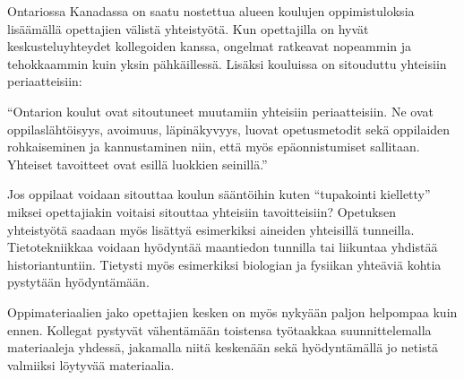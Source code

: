 \documentclass[utf8,bachelor]{gradu3}
\begin{document}
Ontariossa Kanadassa on saatu nostettua alueen koulujen oppimistuloksia lisäämällä opettajien välistä yhteistyötä. Kun opettajilla on hyvät keskusteluyhteydet kollegoiden kanssa, ongelmat ratkeavat nopeammin ja tehokkaammin kuin yksin pähkäillessä. Lisäksi kouluissa on sitouduttu yhteisiin periaatteisiin:

“Ontarion koulut ovat sitoutuneet muutamiin yhteisiin periaatteisiin. Ne ovat oppilaslähtöisyys, avoimuus, läpinäkyvyys, luovat opetusmetodit sekä oppilaiden rohkaiseminen ja kannustaminen niin, että myös epäonnistumiset sallitaan. Yhteiset tavoitteet ovat esillä luokkien seinillä.” \parencite[][]{KanadanMalli} 

Jos oppilaat voidaan sitouttaa koulun sääntöihin kuten “tupakointi kielletty” miksei opettajiakin voitaisi sitouttaa yhteisiin tavoitteisiin? Opetuksen yhteistyötä saadaan myös lisättyä esimerkiksi aineiden yhteisillä tunneilla. Tietotekniikkaa voidaan hyödyntää maantiedon tunnilla tai liikuntaa yhdistää historiantuntiin. Tietysti myös esimerkiksi biologian ja fysiikan yhteäviä kohtia pystytään hyödyntämään.

Oppimateriaalien jako opettajien kesken on myös nykyään paljon helpompaa kuin ennen. Kollegat pystyvät vähentämään toistensa työtaakkaa suunnittelemalla materiaaleja yhdessä, jakamalla niitä keskenään sekä hyödyntämällä jo netistä valmiiksi löytyvää materiaalia.

\end{document}
